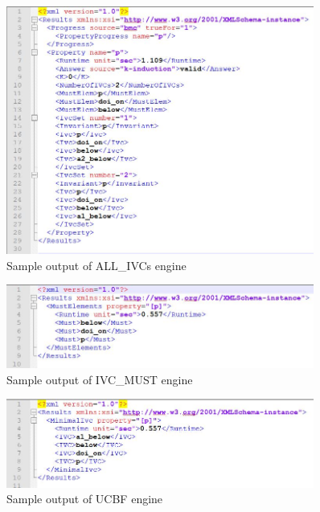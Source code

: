 \begin{figure}
  \centering
  \includegraphics[width=0.9\textwidth]{figs/aivcout.jpg}
  \caption{Sample output of ALL\_IVCs engine}
  \label{fig:aivcout}
\end{figure}

\begin{figure}
  \centering
  \includegraphics[width=0.9\textwidth]{figs/mustout.jpg}
  \caption{Sample output of IVC\_MUST engine}
  \label{fig:mustout}
\end{figure}

\begin{figure}
  \centering
  \includegraphics[width=0.9\textwidth]{figs/ucbfout.jpg}
  \caption{Sample output of UCBF engine}
  \label{fig:ucbfout}
\end{figure}

